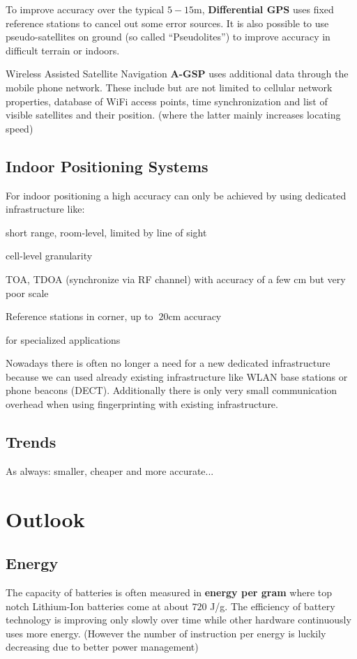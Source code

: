 \documentclass{article}
\newlength{\wideitemsep}
\let\olditem\item
\renewcommand{\item}{\setlength{\itemsep}{\wideitemsep}\olditem}
\begin{document}
\begin{multicols}{2}
To improve accuracy over the typical $5 - 15$m, {\bf Differential GPS} uses
fixed reference stations to cancel out some error sources. It is also possible
to use pseudo-satellites on ground (so called ``Pseudolites'') to improve
accuracy in difficult terrain or indoors.

Wireless Assisted Satellite Navigation {\bf A-GSP} uses additional data through
the mobile phone network. These include but are not limited to cellular network
properties, database of WiFi access points, time synchronization and list of
visible satellites and their position. (where the latter mainly increases
locating speed)

\subsection{Indoor Positioning Systems}
For indoor positioning a high accuracy can only be achieved by using dedicated
infrastructure like:

\begin{description}
\item[Infrared-based Systems] short range, room-level, limited by line of sight
\item[Radio Frequency bacons] cell-level granularity
\item[Ultra Sound] TOA, TDOA (synchronize via RF channel) with accuracy of a few
cm but very poor scale
\item[Ultra Wide Band] Reference stations in corner, up to $~20$cm accuracy
\item[Magnetic, Optical and others] for specialized applications
\end{description}

Nowadays there is often no longer a need for a new dedicated infrastructure
because we can used already existing infrastructure like WLAN base stations or
phone beacons (DECT). Additionally there is only very small communication
overhead when using fingerprinting with existing infrastructure.

\subsection{Trends}
As always: smaller, cheaper and more accurate...

\section{Outlook}
\subsection{Energy}
The capacity of batteries is often measured in {\bf energy per gram} where top
notch Lithium-Ion batteries come at about $720$ J/g. The efficiency of battery
technology is improving only slowly over time while other hardware continuously
uses more energy. (However the number of instruction per energy is
luckily decreasing due to better power management)



\end{multicols}
\end{document}
